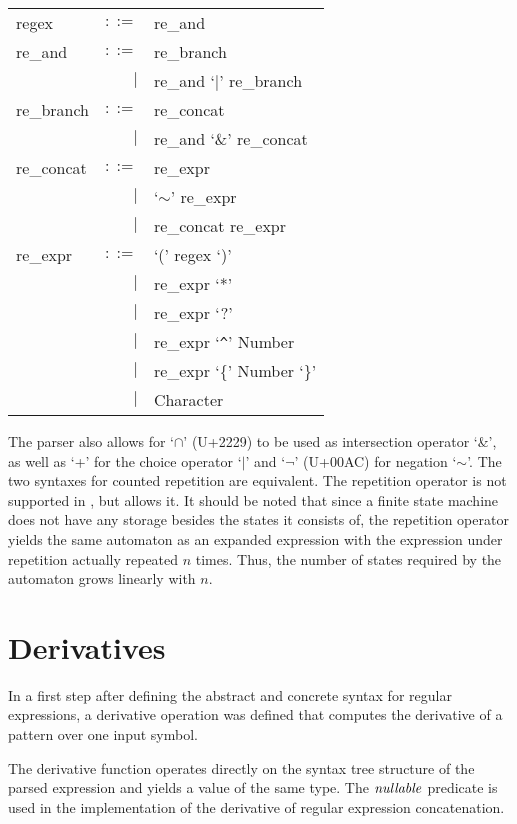 \begin{defn}
   \begin{tabular}{lrl}
      regex		& $::=$	& re\_and			\\
      re\_and		& $::=$	& re\_branch			\\
      			& $|$	& re\_and `$|$' re\_branch	\\
      re\_branch	& $::=$	& re\_concat			\\
      			& $|$	& re\_and `\&' re\_concat	\\
      re\_concat	& $::=$	& re\_expr			\\
			& $|$	& `$\sim$' re\_expr		\\
			& $|$	& re\_concat re\_expr		\\
      re\_expr		& $::=$	& `(' regex `)'			\\
			& $|$	& re\_expr `*'			\\
			& $|$	& re\_expr `?'			\\
                        & $|$	& re\_expr `\verb!^!' Number	\\
                        & $|$	& re\_expr `\{' Number `\}'	\\
                        & $|$	& Character			\\
   \end{tabular}
\end{defn}

The parser also allows for `$\cap$' (U+2229) to be used as intersection operator
`\&', as well as `+' for the choice operator `$|$' and `$\neg$' (U+00AC) for
negation `$\sim$'. The two syntaxes for counted repetition are equivalent.  The
repetition operator is not supported in \ocamllex, but \dreml{} allows
it. It should be noted that since a finite state machine does not have any
storage besides the states it consists of, the repetition operator yields the
same automaton as an expanded expression with the expression under repetition
actually repeated $n$ times.  Thus, the number of states required by the
automaton grows linearly with $n$.


\section{Derivatives}

In a first step after defining the abstract and concrete syntax for regular
expressions, a derivative operation was defined that computes the derivative of
a pattern over one input symbol.

The derivative function operates directly on the syntax tree structure of the
parsed expression and yields a value of the same type. The $\mathit{nullable}$ predicate
is used in the implementation of the derivative of regular expression
concatenation.

